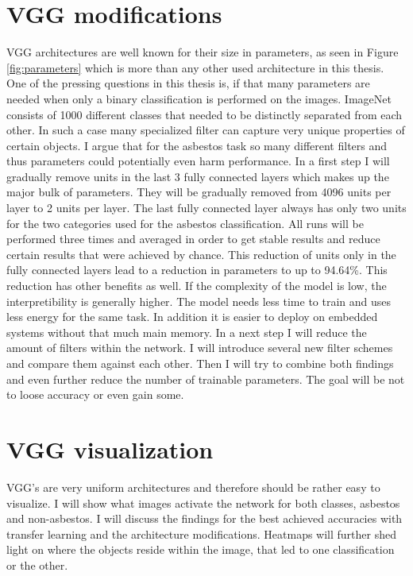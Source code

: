 \section{VGG modifications}

VGG architectures are well known for their size in parameters, as seen in Figure \ref{fig:parameters} which is more than any other used architecture in this thesis. One of the pressing questions in this thesis is, if that many parameters are needed when only a binary classification is performed on the images. ImageNet consists of 1000 different classes that needed to be distinctly separated from each other. In such a case many specialized filter can capture very unique properties of certain objects. I argue that for the asbestos task so many different filters and thus parameters could  potentially even harm performance. In a first step I will gradually remove units in the last 3 fully connected layers which makes up the major bulk of parameters. They will be gradually removed from 4096 units per  layer to 2 units per layer. The last fully connected layer always has only two units for the two categories used for the asbestos classification. All runs will be performed  three times  and averaged in order to get stable results and reduce certain results that were achieved by chance.  This reduction of units only in the fully connected layers lead to a reduction in parameters to up to 94.64\%. This reduction has other benefits as well. If the complexity of the model is low, the interpretibility is generally higher. The model needs less time to train and uses less energy for the same task.  In addition it is easier to deploy on embedded systems without that much main memory. In a next step I will reduce the amount of filters within the network. I will introduce several new filter schemes and compare them against each other. Then I will try to combine both findings and even further reduce the number of trainable parameters. The goal will be not to loose accuracy or even gain some.\\

\section{VGG visualization}

VGG's are very uniform architectures and therefore should be rather easy to visualize. I will show what images activate the network for both  classes, asbestos and non-asbestos. I will discuss the findings for the best achieved accuracies with transfer  learning and the architecture modifications. Heatmaps will further shed light on where the objects reside within the  image, that led to one classification or the other. 

